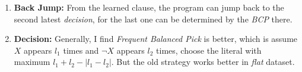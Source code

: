 \documentclass[a4paper,10pt]{article}
\begin{document}
\begin{enumerate}
\item \textbf{Back Jump:} From the learned clause, the program can jump back to the second latest \textit{decision}, for the last one can be determined by the \textit{BCP} there.
\item \textbf{Decision:} Generally, I find \textit{Frequent Balanced Pick} is better, which is assume $X$ appears $l_1$ times and $\neg X$ appears $l_2$ times, choose the literal with maximum $l_1+l_2-|l_1-l_2|$. But the old strategy works better in \textit{flat} dataset.
\end{enumerate}
\end{document}
